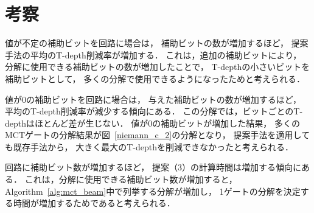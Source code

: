 \section{考察}
値が不定の補助ビットを回路に場合は，
補助ビットの数が増加するほど，
提案手法の平均のT-depth削減率が増加する．
これは，追加の補助ビットにより，
分解に使用できる補助ビットの数が増加したことで，
T-depthの小さいビットを補助ビットとして，
多くの分解で使用できるようになったためと考えられる．
\par
値が0の補助ビットを回路に場合は，
与えた補助ビットの数が増加するほど，
平均のT-depth削減率が減少する傾向にある．
この分解では，ビットごとのT-depthはほとんど差が生じない．
値が0の補助ビットが増加した結果，
多くのMCTゲートの分解結果が図~\ref{niemann_c_2}の分解となり，
提案手法を適用しても既存手法から，
大きく最大のT-depthを削減できなかったと考えられる．
\par
回路に補助ビット数が増加するほど，
提案（3）の計算時間は増加する傾向にある．
これは，分解に使用できる補助ビット数が増加すると，
Algorithm~\ref{alg:mct_beam}中で列挙する分解が増加し，
1ゲートの分解を決定する時間が増加するためであると考えられる．
